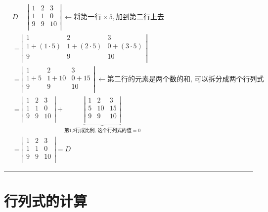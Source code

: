 \documentclass[UTF8]{ctexart}
\begin{document}
	\begin{align*}
			& D=\left| \begin{matrix}
				1&		2&		3\\
				1&		1&		0\\
				9&		9&		10\\
			\end{matrix} \right|\ ←\text{将第一行}×5,\text{加到第二行上去}\\
			& =\left| \begin{matrix}
				1&		2&		3\\
				1+\left( 1\cdot 5 \right)&		1+\left( 2\cdot 5 \right)&		0+\left( 3\cdot 5 \right)\\
				9&		9&		10\\
			\end{matrix} \right|\\
			& =\left| \begin{matrix}
				1&		2&		3\\
				1+5&		1+10&		0+15\\
				9&		9&		10\\
			\end{matrix} \right|\ ←\text{第二行的元素是两个数的和,\ 可以拆分成两个行列式}\\
			& =\left| \begin{matrix}
				1&		2&		3\\
				1&		1&		0\\
				9&		9&		10\\
			\end{matrix} \right|+\underset{\text{第1,2行成比例,\ 这个行列式的值}=0}{\underbrace{\left| \begin{matrix}
						1&		2&		3\\
						5&		10&		15\\
						9&		9&		10\\
					\end{matrix} \right|}}\\
			& =\left| \begin{matrix}
				1&		2&		3\\
				1&		1&		0\\
				9&		9&		10\\
			\end{matrix} \right|=D
	\end{align*}
	
	
	
	\hrule
	
	
	\section{行列式的计算 }
	
\end{document}
